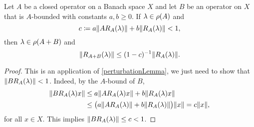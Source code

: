 \begin{lemma} \label{boundOfResolventOfABoundedSum}
Let $A$ be a closed operator on a Banach space $X$ and let $B$ be an operator on $X$ that is $A$-bounded with constants $a,b \geq 0$. If $\lambda\in\rho(A)$ and
\[ c \coloneqq a\lVert AR_A(\lambda)\rVert + b\lVert R_A(\lambda)\rVert < 1, \]
then $\lambda\in\rho(A+B)$ and
\[ \lVert R_{A+B}(\lambda)\rVert \leq (1-c)^{-1}\lVert R_A(\lambda)\rVert. \]
\end{lemma}
\begin{proof}
This is an application of \ref{perturbationLemma}, we just need to show that $\lVert BR_A(\lambda)\rVert < 1$. Indeed, by the $A$-bound of $B$,
\begin{align*}
\lVert BR_A(\lambda)x\rVert &\leq a\lVert AR_A(\lambda)x\rVert + b\lVert R_A(\lambda)x\rVert \\
&\leq \big(a\lVert AR_A(\lambda)\rVert + b\lVert R_A(\lambda)\rVert\big)\lVert x\rVert = c\lVert x\rVert,
\end{align*}
for all $x\in X$. This implies $\lVert BR_A(\lambda)\rVert \leq c < 1$.
\end{proof}

